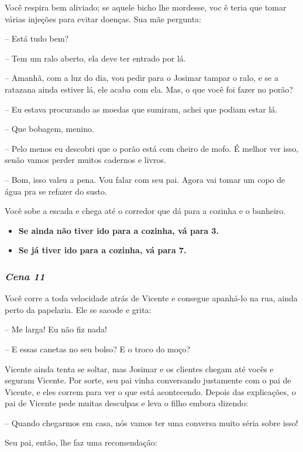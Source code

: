 Você respira bem aliviado; se aquele bicho lhe mordesse, voc ê teria que tomar várias injeções para evitar doenças. Sua mãe pergunta:

-- Está tudo bem?

-- Tem um ralo aberto, ela deve ter entrado por lá.

-- Amanhã, com a luz do dia, vou pedir para o Josimar tampar o ralo, e se a ratazana ainda estiver lá, ele acaba com ela. Mas, o que você foi fazer no porão?

-- Eu estava procurando as moedas que sumiram, achei que podiam estar lá.

-- Que bobagem, menino.

-- Pelo menos eu descobri que o porão está com cheiro de mofo. É melhor ver isso, senão vamos perder muitos cadernos e livros.

-- Bom, isso valeu a pena. Vou falar com seu pai. Agora vai tomar um copo de água pra se refazer do susto.

Você sobe a escada e chega até o corredor que dá para a cozinha e o banheiro.

\begin{itemize}
	\item \textbf{Se ainda não tiver ido para a cozinha, vá para 3.}
	\item \textbf{Se já tiver ido para a cozinha, vá para 7.}
\end{itemize}

\bigskip\medskip

\subsubsection*{\textit{\textbf{Cena 11}}}
Você corre a toda velocidade atrás de Vicente e consegue apanhá-lo na rua, ainda perto da papelaria. Ele se sacode e grita:

-- Me larga! Eu não fiz nada!

-- E essas canetas no seu bolso? E o troco do moço?

Vicente ainda tenta se soltar, mas Josimar e os clientes chegam até vocês e seguram Vicente. Por sorte, seu pai vinha conversando justamente com o pai de Vicente, e eles correm para ver o que está acontecendo. Depois das explicações, o pai de Vicente pede muitas desculpas e leva o filho embora dizendo:

-- Quando chegarmos em casa, nós vamos ter uma conversa muito séria sobre isso!

Seu pai, então, lhe faz uma recomendação:

